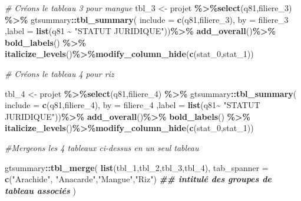 \documentclass[
]{article}
\newenvironment{Shaded}{\begin{snugshade}}{\end{snugshade}}
\newcommand{\AttributeTok}[1]{\textcolor[rgb]{0.13,0.29,0.53}{#1}}
\newcommand{\CommentTok}[1]{\textcolor[rgb]{0.56,0.35,0.01}{\textit{#1}}}
\newcommand{\DocumentationTok}[1]{\textcolor[rgb]{0.56,0.35,0.01}{\textbf{\textit{#1}}}}
\newcommand{\FunctionTok}[1]{\textcolor[rgb]{0.13,0.29,0.53}{\textbf{#1}}}
\newcommand{\NormalTok}[1]{#1}
\newcommand{\OtherTok}[1]{\textcolor[rgb]{0.56,0.35,0.01}{#1}}
\newcommand{\SpecialCharTok}[1]{\textcolor[rgb]{0.81,0.36,0.00}{\textbf{#1}}}
\newcommand{\StringTok}[1]{\textcolor[rgb]{0.31,0.60,0.02}{#1}}
\begin{document}
\begin{Shaded}
\begin{Highlighting}[]
               \CommentTok{\# Créons le tableau 3 pour mangue}
\NormalTok{tbl\_3 }\OtherTok{\textless{}{-}}\NormalTok{ projet }\SpecialCharTok{\%\textgreater{}\%}\FunctionTok{select}\NormalTok{(q81,filiere\_3) }\SpecialCharTok{\%\textgreater{}\%}
\NormalTok{  gtsummary}\SpecialCharTok{::}\FunctionTok{tbl\_summary}\NormalTok{(}
    \AttributeTok{include =} \FunctionTok{c}\NormalTok{(q81,filiere\_3),}
    \AttributeTok{by =}\NormalTok{ filiere\_3}
\NormalTok{  ,}\AttributeTok{label =} \FunctionTok{list}\NormalTok{(q81 }\SpecialCharTok{\textasciitilde{}} \StringTok{"STATUT JURIDIQUE"}\NormalTok{))}\SpecialCharTok{\%\textgreater{}\%}
  \FunctionTok{add\_overall}\NormalTok{()}\SpecialCharTok{\%\textgreater{}\%}
  \FunctionTok{bold\_labels}\NormalTok{() }\SpecialCharTok{\%\textgreater{}\%}
  \FunctionTok{italicize\_levels}\NormalTok{()}\SpecialCharTok{\%\textgreater{}\%}\FunctionTok{modify\_column\_hide}\NormalTok{(}\FunctionTok{c}\NormalTok{(stat\_0,stat\_1))}

               \CommentTok{\# Créons le tableau 4 pour riz}

\NormalTok{tbl\_4 }\OtherTok{\textless{}{-}}\NormalTok{ projet }\SpecialCharTok{\%\textgreater{}\%}\FunctionTok{select}\NormalTok{(q81,filiere\_4) }\SpecialCharTok{\%\textgreater{}\%}
\NormalTok{  gtsummary}\SpecialCharTok{::}\FunctionTok{tbl\_summary}\NormalTok{(}
    \AttributeTok{include =} \FunctionTok{c}\NormalTok{(q81,filiere\_4),}
    \AttributeTok{by =}\NormalTok{ filiere\_4}
\NormalTok{  ,}\AttributeTok{label =} \FunctionTok{list}\NormalTok{(q81}\SpecialCharTok{\textasciitilde{}} \StringTok{"STATUT JURIDIQUE"}\NormalTok{))}\SpecialCharTok{\%\textgreater{}\%}
  \FunctionTok{add\_overall}\NormalTok{()}\SpecialCharTok{\%\textgreater{}\%}
  \FunctionTok{bold\_labels}\NormalTok{() }\SpecialCharTok{\%\textgreater{}\%}
  \FunctionTok{italicize\_levels}\NormalTok{()}\SpecialCharTok{\%\textgreater{}\%}\FunctionTok{modify\_column\_hide}\NormalTok{(}\FunctionTok{c}\NormalTok{(stat\_0,stat\_1))}

               \CommentTok{\#Mergeons les 4 tableaux ci{-}dessus en un seul tableau}

\NormalTok{gtsummary}\SpecialCharTok{::}\FunctionTok{tbl\_merge}\NormalTok{(}
  \FunctionTok{list}\NormalTok{(tbl\_1,tbl\_2,tbl\_3,tbl\_4),}
  \AttributeTok{tab\_spanner =}  \FunctionTok{c}\NormalTok{(}\StringTok{"Arachide"}\NormalTok{, }\StringTok{"Anacarde"}\NormalTok{,}\StringTok{"Mangue"}\NormalTok{,}\StringTok{"Riz"}\NormalTok{) }
  \DocumentationTok{\#\# intitulé des groupes de tableau associés}
\NormalTok{)}
\end{Highlighting}
\end{Shaded}
\end{document}
